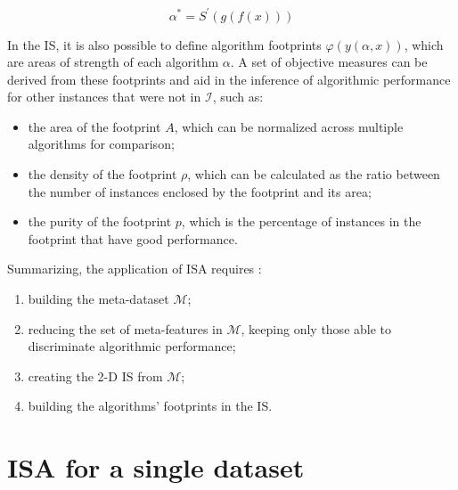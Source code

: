 \begin{equation}
	\alpha^* = S^\prime(g(f(x)))
\end{equation}

In the IS, it is also possible to define algorithm footprints $\varphi(y(\alpha, x))$, which are areas of strength of each algorithm $\alpha$. A set of objective measures can be derived from these footprints and aid in the inference of algorithmic performance for other instances that were not in $\mathcal{I}$, such as: 

\begin{itemize}
	\item the area of the footprint $A$, which can be normalized across multiple algorithms for comparison;
	\item the density of the footprint $\rho$, which can be calculated as the ratio between the number of instances enclosed by the footprint and its area;
	\item the purity of the footprint $p$, which is the percentage of instances in the footprint that have good performance.
\end{itemize}

Summarizing, the application of ISA requires \cite{Munoz2018}:

\begin{enumerate}
	\item building the meta-dataset $\mathcal{M}$;
	\item reducing the set of meta-features in $\mathcal{M}$, keeping only those able to discriminate algorithmic performance;
	\item creating the 2-D IS from $\mathcal{M}$;
	\item building the algorithms' footprints in the IS.
\end{enumerate}

\section{ISA for a single dataset}